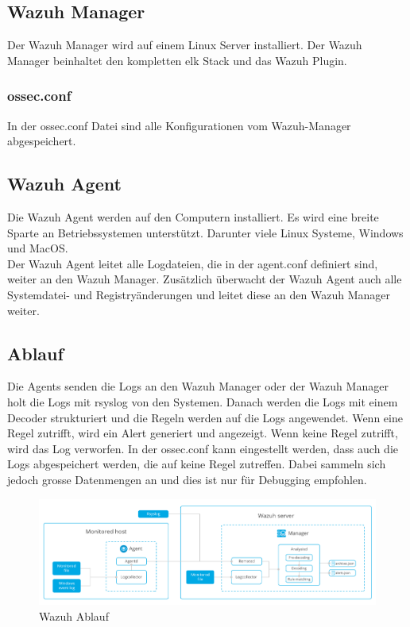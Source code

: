 \subsection{Wazuh Manager}
Der Wazuh Manager wird auf einem Linux Server installiert.
Der Wazuh Manager beinhaltet den kompletten \acrshort{elk} Stack und das Wazuh Plugin. 

\subsubsection{ossec.conf}
In der ossec.conf Datei sind alle Konfigurationen vom Wazuh-Manager abgespeichert.

\subsection{Wazuh Agent}
Die Wazuh Agent werden auf den Computern installiert.
Es wird eine breite Sparte an Betriebssystemen unterstützt. Darunter viele Linux Systeme, Windows und MacOS.\\

Der Wazuh Agent leitet alle Logdateien, die in der agent.conf definiert sind, weiter an den Wazuh Manager.
Zusätzlich überwacht der Wazuh Agent auch alle Systemdatei- und Registryänderungen und leitet diese an den Wazuh Manager weiter. 

\subsection{Ablauf}
Die Agents senden die Logs an den Wazuh Manager oder der Wazuh Manager holt die Logs mit rsyslog von den Systemen. 
Danach werden die Logs mit einem Decoder strukturiert und die Regeln werden auf die Logs angewendet.
Wenn eine Regel zutrifft, wird ein Alert generiert und angezeigt.
Wenn keine Regel zutrifft, wird das Log verworfen.
In der ossec.conf kann eingestellt werden, dass auch die Logs abgespeichert werden, die auf keine Regel zutreffen.
Dabei sammeln sich jedoch grosse Datenmengen an und dies ist nur für Debugging empfohlen.

\begin{figure}[H]
    \centering
    \includegraphics[width=\linewidth]{../img/wazuh-ablauf.png}
    \caption[Wazuh Ablauf]{Wazuh Ablauf\footnotemark}
\end{figure}


